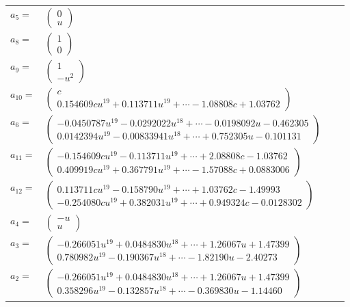 \documentclass[1p]{elsarticle_modified}
\theoremstyle{definition}
\begin{document}
\begin{tabular}{m{7pt} m{180pt} m{7pt} m{180pt} }
\flushright $a_{5}=$&$\begin{pmatrix}0\\u\end{pmatrix}$ \\
\flushright $a_{8}=$&$\begin{pmatrix}1\\0\end{pmatrix}$ \\
\flushright $a_{9}=$&$\begin{pmatrix}1\\- u^2\end{pmatrix}$ \\
\flushright $a_{10}=$&$\begin{pmatrix}c\\0.154609 c u^{19}+0.113711 u^{19}+\cdots-1.08808 c+1.03762\end{pmatrix}$ \\
\flushright $a_{6}=$&$\begin{pmatrix}-0.0450787 u^{19}-0.0292022 u^{18}+\cdots-0.0198092 u-0.462305\\0.0142394 u^{19}-0.00833941 u^{18}+\cdots+0.752305 u-0.101131\end{pmatrix}$ \\
\flushright $a_{11}=$&$\begin{pmatrix}-0.154609 c u^{19}-0.113711 u^{19}+\cdots+2.08808 c-1.03762\\0.409919 c u^{19}+0.367791 u^{19}+\cdots-1.57088 c+0.0883006\end{pmatrix}$ \\
\flushright $a_{12}=$&$\begin{pmatrix}0.113711 c u^{19}-0.158790 u^{19}+\cdots+1.03762 c-1.49993\\-0.254080 c u^{19}+0.382031 u^{19}+\cdots+0.949324 c-0.0128302\end{pmatrix}$ \\
\flushright $a_{4}=$&$\begin{pmatrix}- u\\u\end{pmatrix}$ \\
\flushright $a_{3}=$&$\begin{pmatrix}-0.266051 u^{19}+0.0484830 u^{18}+\cdots+1.26067 u+1.47399\\0.780982 u^{19}-0.190367 u^{18}+\cdots-1.82190 u-2.40273\end{pmatrix}$ \\
\flushright $a_{2}=$&$\begin{pmatrix}-0.266051 u^{19}+0.0484830 u^{18}+\cdots+1.26067 u+1.47399\\0.358296 u^{19}-0.132857 u^{18}+\cdots-0.369830 u-1.14460\end{pmatrix}$ \\

\end{tabular}
\end{document}

